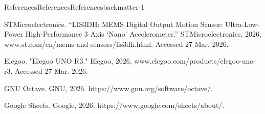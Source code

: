 \documentclass[oneside,10pt,]{book}
\numberwithin{equation}{section}
\begin{document}
\begin{references-chapter-numberless}{References}{References}{}{References}{}{}{backmatter-1}
\begin{referencelist}
\hypertarget{ST}{}STMicroelectronics. “LIS3DH: MEMS Digital Output Motion Sensor: Ultra-Low-Power High-Performance 3-Axis ‘Nano’ Accelerometer.” STMicroelectronics, 2026, www.st.com\slash{}en\slash{}mems-and-sensors\slash{}lis3dh.html. Accessed 27 Mar. 2026.%

\hypertarget{Elegoo}{}Elegoo. "Elegoo UNO R3." Elegoo, 2026, www.elegoo.com\slash{}products\slash{}elegoo-uno-r3. Accessed 27 Mar. 2026.%

\hypertarget{octave}{}GNU Octave. GNU, 2026. https:\slash{}\slash{}www.gnu.org\slash{}software\slash{}octave\slash{}.%

\hypertarget{sheets}{}Google Sheets. Google, 2026. https:\slash{}\slash{}www.google.com\slash{}sheets\slash{}about\slash{}.%

\end{referencelist}
\end{references-chapter-numberless}
\end{document}
